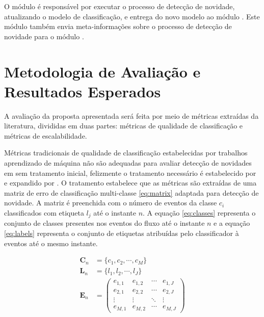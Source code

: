 O módulo \detector é responsável por executar o processo de detecção de
novidade, atualizando o modelo de classificação, e entrega do novo modelo
ao módulo \classify.
Este módulo também envia meta-informações sobre o processo de detecção de
novidade para o módulo \sink.

\section{Metodologia de Avaliação e Resultados Esperados}\label{sec:esperados}


A avaliação da proposta apresentada será feita por meio de métricas extraídas da
literatura, divididas em duas partes: métricas de qualidade de classificação
e métricas de escalabilidade.

Métricas tradicionais de qualidade de classificação estabelecidas por trabalhos
aprendizado de máquina não são adequadas para avaliar detecção de novidades em
\streams sem tratamento inicial, felizmente o tratamento necessário é
estabelecido por  e expandido por
.
O tratamento estabelece que as métricas são extraídas de uma matriz de erro de
classificação multi-classe \ref{eq:matrix} adaptada para detecção de novidade.
A matriz é preenchida com o número de eventos da classe $c_i$ classificados com
etiqueta $l_j$ até o instante $n$.
A equação \ref{eq:classes} representa o conjunto de classes presentes nos eventos
do fluxo até o instante $n$ e a equação \ref{eq:labels} representa o conjunto
de etiquetas atribuídas pelo classificador à eventos até o mesmo instante.

\begin{align}
  \mathbf{C}_n &= \{ c_1, c_2, \cdots, c_M \}  \label{eq:classes} \\
  \mathbf{L}_n &= \{ l_1, l_2, \cdots, l_J \}  \label{eq:labels} \\
  \mathbf{E}_n &= \begin{pmatrix}
    e_{1,1} & e_{1,2} & \cdots & e_{1,J} \\
    e_{2,1} & e_{2,2} & \cdots & e_{2,J} \\
    \vdots  & \vdots  & \ddots & \vdots  \\
    e_{M,1} & e_{M,2} & \cdots & e_{M,J} 
  \end{pmatrix}  \label{eq:matrix}
\end{align}

